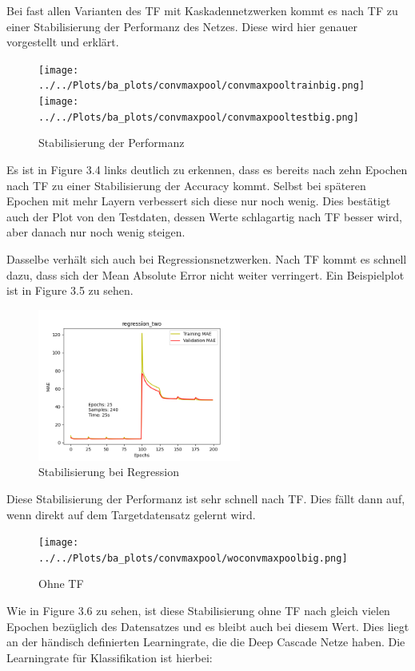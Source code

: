 Bei fast allen Varianten des TF mit Kaskadennetzwerken kommt es nach TF zu einer Stabilisierung der Performanz des Netzes. 
Diese wird hier genauer vorgestellt und erklärt. 

\begin{figure}[htpb]
    \texttt{[image: ../../Plots/ba\_plots/convmaxpool/convmaxpooltrainbig.png]}
    \texttt{[image: ../../Plots/ba\_plots/convmaxpool/convmaxpooltestbig.png]}
    \caption{\label{fig:cmptrbig} Stabilisierung der Performanz}
\end{figure}

Es ist in Figure 3.4 links deutlich zu erkennen, dass es bereits nach zehn Epochen nach TF zu einer Stabilisierung der Accuracy kommt. 
Selbst bei späteren Epochen mit mehr Layern verbessert sich diese nur noch wenig. Dies bestätigt auch der Plot von den Testdaten, dessen 
Werte schlagartig nach TF besser wird, aber danach nur noch wenig steigen. 

Dasselbe verhält sich auch bei Regressionsnetzwerken. Nach TF kommt es schnell dazu, dass sich der Mean Absolute Error nicht weiter verringert. 
Ein Beispielplot ist in Figure 3.5 zu sehen. 

\begin{figure}[htpb]
    \includegraphics[height=5cm]{../../Plots/ba_plots/regr2/regr2train.png}
    \caption{\label{fig:regr2tr} Stabilisierung bei Regression}
\end{figure}

Diese Stabilisierung der Performanz ist sehr schnell nach TF. Dies fällt dann auf, wenn direkt auf dem Targetdatensatz gelernt wird. 

\begin{figure}[htpb]
    \texttt{[image: ../../Plots/ba\_plots/convmaxpool/woconvmaxpoolbig.png]}
    \caption{\label{fig:cmpwotf} Ohne TF}
\end{figure}

Wie in Figure 3.6 zu sehen, ist diese Stabilisierung ohne TF nach gleich vielen Epochen bezüglich des Datensatzes und es bleibt auch bei diesem 
Wert. Dies liegt an der händisch definierten Learningrate, die die Deep Cascade Netze haben. Die Learningrate für Klassifikation ist hierbei: 


